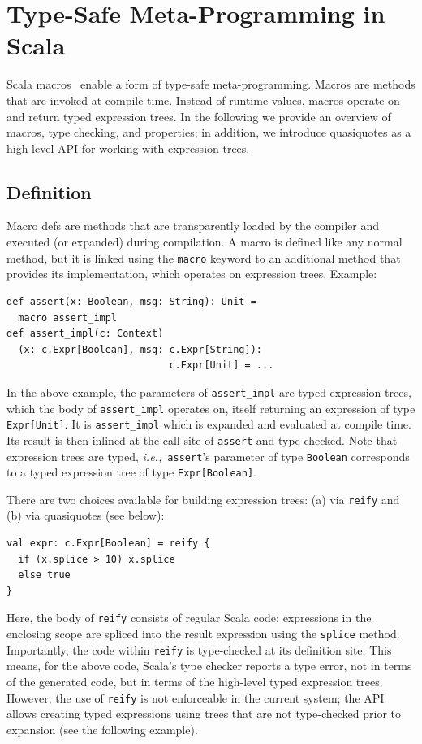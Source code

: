 \documentclass[preprint,nocopyrightspace]{sigplanconf}
\newcommand{\ie}{{\em i.e.,~}}
\begin{document}
\section{Type-Safe Meta-Programming in Scala}
\label{sec:macros}

Scala macros~\cite{Burmako2012, Burmako2013} enable a form of type-safe
meta-programming. Macros are methods that are invoked at compile time. Instead of
runtime values, macros operate on and return typed expression trees. In the
following we provide an overview of macros, type checking, and properties;
in addition, we introduce quasiquotes as a high-level API
for working with expression trees.

\subsection{Definition}

Macro defs are methods that are transparently loaded by
the compiler and executed (or expanded) during compilation. A macro is defined
like any normal method, but it is linked using the \verb|macro| keyword to an
additional method that provides its implementation, which operates on
expression trees. Example:
\begin{lstlisting}
def assert(x: Boolean, msg: String): Unit =
  macro assert_impl
def assert_impl(c: Context)
  (x: c.Expr[Boolean], msg: c.Expr[String]):
                            c.Expr[Unit] = ...
\end{lstlisting}
\noindent
In the above example, the parameters of \verb|assert_impl| are typed
expression trees, which the body of \verb|assert_impl| operates on, itself
returning an expression of type \verb|Expr[Unit]|. It is \verb|assert_impl|
which is expanded and evaluated at compile time. Its result is then inlined at
the call site of \verb|assert| and type-checked.
Note that expression trees are typed, \ie \verb|assert|'s parameter of type
\verb|Boolean| corresponds to a typed expression tree of type
\verb|Expr[Boolean]|.

There are two choices available for building expression
trees: (a) via \verb|reify| and (b) via quasiquotes (see below):
\begin{lstlisting}
val expr: c.Expr[Boolean] = reify {
  if (x.splice > 10) x.splice
  else true
}
\end{lstlisting}
\noindent
Here, the body of \verb|reify| consists of regular Scala code; expressions in
the enclosing scope are spliced into the result expression using the
\verb|splice| method. Importantly, the code within \verb|reify| is
type-checked at its definition site. This means, for the above code, Scala's type
checker reports a type error, not in terms of the generated code, but in terms
of the high-level typed expression trees. However, the use of \verb|reify| is not
enforceable in the current system; the API allows creating typed expressions
using trees that are not type-checked prior to expansion (see the following example).
\end{document}
